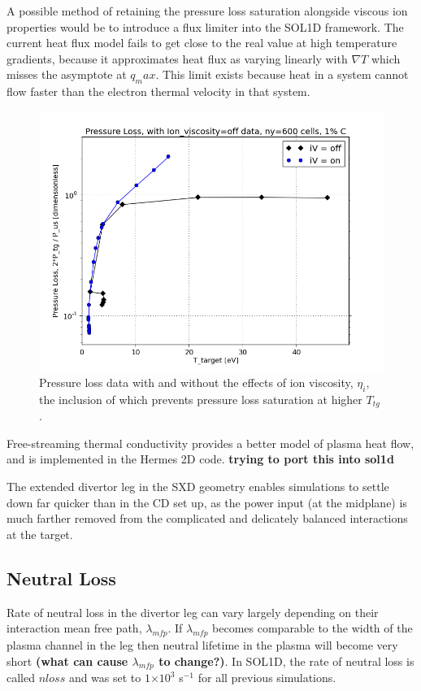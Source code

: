 \documentclass[11pt]{article}  %
\providecommand{\e}[1]{\ensuremath{\times 10^{#1}}} %
\providecommand{\pow}[1]{{$^{#1}$}} %
\providecommand{\Ttg}{$T_{tg}~$} %
\begin{document}
A possible method of retaining the pressure loss saturation alongside viscous ion properties would be to introduce a flux limiter into the SOL1D framework. The current heat flux model \cite{Braginskii1965} fails to get close to the real value at high temperature gradients, because it approximates heat flux as varying linearly with $\nabla T$ which misses the asymptote at $q_max$. This limit exists because heat in a system cannot flow faster than the electron thermal velocity in that system.

\begin{figure}
\includegraphics[scale=0.5]{Figures/sol1d/PL_iVpts.png}
\centering
\caption{Pressure loss data with and without the effects of ion viscosity, $\eta_i$, the inclusion of which prevents pressure loss saturation at higher \Ttg.}\label{figPL_iVpts}
\end{figure}

Free-streaming thermal conductivity provides a better model of plasma heat flow, and is implemented in the Hermes 2D code. \textbf{trying to port this into sol1d}

The extended divertor leg in the SXD geometry enables simulations to settle down far quicker than in the CD set up, as the power input (at the midplane) is much farther removed from the complicated and delicately balanced interactions at the target. 



\subsection{Neutral Loss}\label{ssecNloss}
Rate of neutral loss in the divertor leg can vary largely depending on their interaction mean free path, $\lambda_{mfp}$. If $\lambda_{mfp}$ becomes comparable to the width of the plasma channel in the leg then neutral lifetime in the plasma will become very short \textbf{(what can cause $\lambda_{mfp}$ to change?)}. In SOL1D, the rate of neutral loss is called $nloss$ and was set to $1\e{3}$ s\pow{-1} for all previous simulations. 
\end{document}
